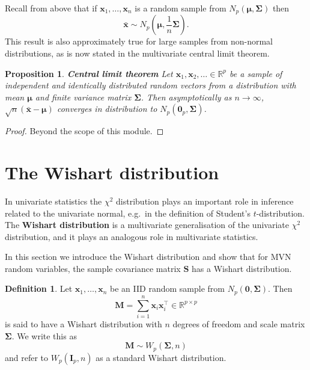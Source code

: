 \documentclass[
]{book}
\newtheorem{proposition}{Proposition}[chapter]
\theoremstyle{definition}
\newtheorem{definition}{Definition}[chapter]
\theoremstyle{definition}
\theoremstyle{definition}
\theoremstyle{definition}
\theoremstyle{remark}
\begin{document}
Recall from above that if \(\mathbf x_1, \ldots, \mathbf x_n\) is a random sample from \(N_p({\boldsymbol{\mu}}, \boldsymbol{\Sigma})\) then \[\bar{\mathbf x} \sim N_p ({\boldsymbol{\mu}}, \frac{1}{n}\boldsymbol{\Sigma}).\] This result is also approximately true for large samples from non-normal distributions, as is now stated in the multivariate central limit theorem.

\begin{proposition}
\protect\hypertarget{prp:clt}{}\label{prp:clt}\textbf{Central limit theorem} Let \(\mathbf x_1, \mathbf x_2, \ldots \in \mathbb{R}^p\) be a sample of independent and identically distributed random vectors from a distribution with mean \({\boldsymbol{\mu}}\) and finite variance matrix \(\boldsymbol{\Sigma}\). Then asymptotically as \(n \rightarrow \infty\), \(\sqrt{n}(\bar{\mathbf x}-{\boldsymbol{\mu}})\) converges in distribution to \(N_p ({\mathbf 0}_p, \boldsymbol{\Sigma})\).
\end{proposition}

\begin{proof}
Beyond the scope of this module.
\end{proof}

\section{The Wishart distribution}\label{the-wishart-distribution}

In univariate statistics the \(\chi^2\) distribution plays an important role in inference related to the univariate normal, e.g.~in the definition of Student's \(t\)-distribution.\\
The \textbf{Wishart distribution} is a multivariate generalisation of the univariate \(\chi^2\) distribution, and it plays an analogous role in multivariate statistics.

In this section we introduce the Wishart distribution and show that for MVN random variables, the sample covariance matrix \(\mathbf S\) has a Wishart distribution.

\begin{definition}
\protect\hypertarget{def:wishart}{}\label{def:wishart}Let \(\mathbf x_1, \ldots, \mathbf x_n\) be an IID random sample from \(N_p ({\boldsymbol 0}, \boldsymbol{\Sigma})\). Then \[\mathbf M= \sum_{i=1}^n \mathbf x_i \mathbf x_i^\top \in \mathbb{R}^{p\times p}\]
is said to have a Wishart distribution with \(n\) degrees of freedom and scale matrix \(\boldsymbol{\Sigma}\). We write this as
\[\mathbf M\sim W_p(\boldsymbol{\Sigma}, n)\]
and refer to \(W_p(\mathbf I_p,n)\) as a standard Wishart distribution.
\end{definition}
\end{document}

